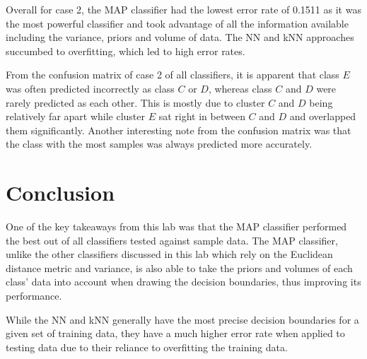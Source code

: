 \documentclass{article}
\begin{document}
Overall for case 2, the MAP classifier had the lowest error rate of 0.1511 as it was the most powerful classifier and took advantage of all the information available including the variance, priors and volume of data. The NN and kNN approaches succumbed to overfitting, which led to high error rates.

From the confusion matrix of case 2 of all classifiers, it is apparent that class $E$ was often predicted incorrectly as class $C$ or $D$, whereas class $C$ and $D$ were rarely predicted as each other. This is mostly due to cluster $C$ and $D$ being relatively far apart while cluster $E$ sat right in between $C$ and $D$ and overlapped them significantly. Another interesting note from the confusion matrix was that the class with the most samples was always predicted more accurately.

\section{Conclusion}
One of the key takeaways from this lab was that the MAP classifier performed the best out of all classifiers tested against sample data. The MAP classifier, unlike the other classifiers discussed in this lab which rely on the Euclidean distance metric and variance, is also able to take the priors and volumes of each class' data into account when drawing the decision boundaries, thus improving its performance.

While the NN and kNN generally have the most precise decision boundaries for a given set of training data, they have a much higher error rate when applied to testing data due to their reliance to overfitting the training data.
\end{document}
